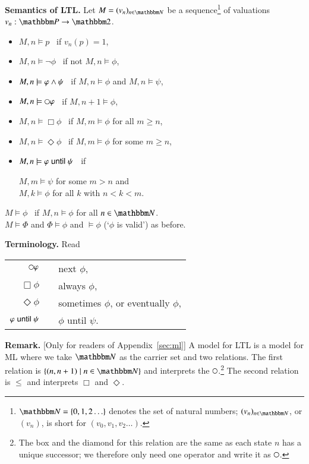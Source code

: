 \bigskip\noindent\textbf{Semantics of LTL\@. } Let $M=(v_n)_{n\in\bbN}$
be a sequence\footnote{$\bbN=\{0,1,2\ldots\}$ denotes the set of
  natural numbers; $(v_n)_{n\in\bbN}$, or $(v_n)$, is short
  for $(v_0,v_1,v_2\ldots)$.} of valuations $v_n:\bbP\to\bbtwo$.
\begin{itemize}
\item $M,n\models p$ \ if $v_n(p)=1$,
\item $M,n\models \neg \phi$ \ if not $M,n\models\phi$,
\item $M,n\models \varphi\wedge\psi$ \ if $M,n\models\phi$ and
  $M,n\models\psi$,
\item $M,n\models\next\phi$ \ if $M,n+1\models\phi$,
\item $M,n\models\Box\phi$ \ if $M,m\models\phi$ for all $m\ge n$,
\item $M,n\models\Diamond\phi$ \ if $M,m\models\phi$ for some $m\ge n$,
\item $M,n\models \varphi\mathrel{\mathsf{until}}\psi$ \ if \ \
  \parbox{15em}{$M,m\models\psi$ for some $m> n$ and\\
    $M,k\models\phi$ for all $k$ with $n< k < m$.}
\end{itemize}

\noindent $M\models\phi$ \ if $M,n\models\phi$ for all $n\in\bbN$.\\
$M\models\Phi$ and $\Phi\models\phi$ and $\models\phi$ (`$\phi$ is
valid') as before.

\bigskip\noindent\textbf{Terminology. } Read \\
\renewcommand{\arraystretch}{1.4}
\hspace*{2em} \begin{tabular}{rcl}
$\next\phi$ && next $\phi$, \\
$\Box \phi$ & & always $\phi$,\\
$\Diamond\phi$ && sometimes $\phi$, or eventually $\phi$,\\ 
$\varphi\mathrel{\mathsf{until}}\psi$ && $\phi$ until $\psi$.
\end{tabular}

\bigskip\noindent\textbf{Remark. }
[Only for readers of Appendix~\ref{sec:ml}] A model for LTL is a model
for ML where we take $\bbN$ as the carrier set and two relations. The
first relation is $\{(n,n+1)\mid n\in\bbN\}$ and interprets the
$\next$.\footnote{The box and the diamond for this relation are the
  same as each state $n$ has a unique successor; we therefore only
  need one operator and write it as $\next$.} The second relation is
$\le$ and interprets $\Box$ and $\Diamond$.

